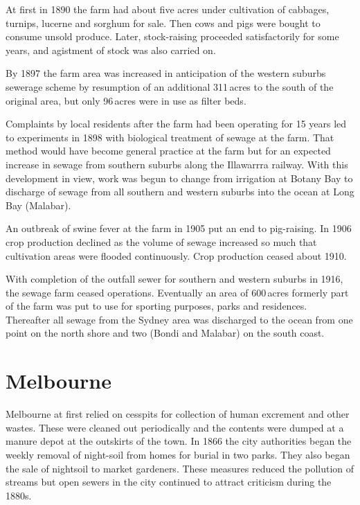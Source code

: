 At first in 1890 the farm had about five acres under cultivation of
cabbages, tur\-nips, lucerne and sorghum for sale.  Then cows and pigs
were bought to consume unsold produce.  Later, stock-raising proceeded
satisfactorily for some years, and agistment of stock was also carried
on.

By 1897 the farm area was increased in anticipation of the western
suburbs sewerage scheme by resumption of an additional 311\,acres to
the south of the original area, but only 96\,acres were in use as
filter beds.

Complaints by local residents after the farm had been operating for 15
years led to experiments in 1898 with biological treatment of sewage
at the farm.  That method would have become general practice at the
farm but for an expected increase in sewage from southern suburbs
along the Illawarrra railway.  With this development in view, work was
begun to change from irrigation at Botany Bay to discharge of sewage
from all southern and western suburbs into the ocean at Long Bay
 (Malabar).

An outbreak of swine fever at the farm in 1905 put an end to
pig-raising.  In 1906 crop production declined as the volume of sewage
increased so much that cultivation areas were flooded continuously.
Crop production ceased about 1910.

With completion of the outfall sewer for southern and western suburbs
in 1916, the sewage farm ceased operations.  Eventually an area of
600\,acres formerly part of the farm was put to use for sporting
purposes, parks and residences.  Thereafter all sewage from the Sydney
area was discharged to the ocean from one point on the north shore and
two (Bondi and Malabar)  on the south
coast.

\section*{Melbourne}

Melbourne at first relied on cesspits for collection of human
excrement and other wastes.  These were cleaned out periodically and
the contents were dumped at a manure depot at the outskirts of the
town.  In 1866 the city authorities began the weekly removal of
night-soil from homes for burial in two parks.  They also began the
sale of nightsoil to market gardeners.  These measures reduced the
pollution of streams but open sewers in the city continued to attract
criticism during the 1880s.

